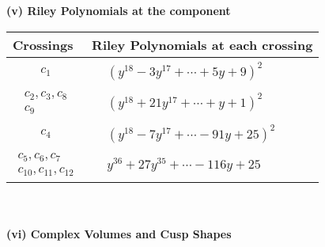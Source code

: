 \documentclass[1p]{elsarticle_modified}
\theoremstyle{definition}
\begin{document}
\newpage\renewcommand{\arraystretch}{1}
\flushleft \textbf{(v) Riley Polynomials at the component}\newline \\
\begin{tabular}{m{50pt}|m{274pt}}
Crossings & \hspace{64pt}Riley Polynomials at each crossing \\
\hline $$\begin{aligned}c_{1}\end{aligned}$$&$\begin{aligned}
&(y^{18}-3 y^{17}+\cdots+5 y+9)^{2}
\end{aligned}$\\
\hline $$\begin{aligned}c_{2},c_{3},c_{8}\\c_{9}\end{aligned}$$&$\begin{aligned}
&(y^{18}+21 y^{17}+\cdots+y+1)^{2}
\end{aligned}$\\
\hline $$\begin{aligned}c_{4}\end{aligned}$$&$\begin{aligned}
&(y^{18}-7 y^{17}+\cdots-91 y+25)^{2}
\end{aligned}$\\
\hline $$\begin{aligned}c_{5},c_{6},c_{7}\\c_{10},c_{11},c_{12}\end{aligned}$$&$\begin{aligned}
&y^{36}+27 y^{35}+\cdots-116 y+25
\end{aligned}$\\
\hline
\end{tabular}\\~\\
\newpage\flushleft \textbf{(vi) Complex Volumes and Cusp Shapes}
\end{document}

